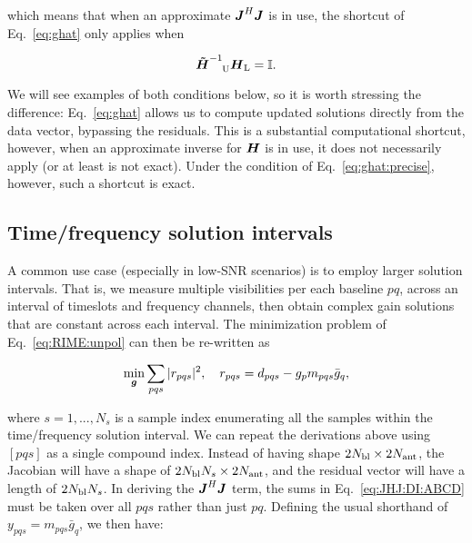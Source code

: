 \documentclass[useAMS,usenatbib]{mn2e}
\newcommand{\II}{\mathbb{I}}
\newcommand{\mat}[1]{{\bmath{#1}}}
\newcommand{\JJ}{\mat{J}} %
\newcommand{\HH}{\mat{H}} %
\newcommand{\HHa}{\mat{\tilde{H}}} %
\newcommand{\JHJ}{\JJ^H\JJ} %
\newcommand{\TOP}{\mathrm{U}}%
\newcommand{\LEFT}{\mathrm{L}}
\numberwithin{equation}{section} %
\providecommand{\DIFdelbegin}{} %
\providecommand{\DIFdelend}{} %
\begin{document}
\DIFdelend which means that when an approximate $\JHJ$ is in use, the shortcut of Eq.~\ref{eq:ghat} only applies when 
\DIFdelbegin %

\DIFdelend \begin{equation}
\label{eq:ghat:precise}
\HHa^{-1}_{~~~\TOP} \HH_\LEFT=\II.
\end{equation}

We will see examples of both conditions below, so it is worth stressing the difference: Eq.~\ref{eq:ghat}
allows us to compute updated solutions directly from the data vector, bypassing the residuals. This is a 
substantial computational shortcut, however, when an approximate inverse for $\HH$ is in use, it 
does not necessarily apply (or at least is not exact). Under the condition of Eq.~\ref{eq:ghat:precise}, however, 
such a shortcut is exact.


\subsection{Time/frequency solution intervals}
\label{sec:unpol:DI:avg}
\label{sec:solution-intervals}

\newcommand{\Ns}{N_s}

A common use case (especially in low-SNR scenarios) is to employ larger solution intervals. 
That is, we measure multiple visibilities per each baseline $pq$, across an interval of timeslots and
frequency channels, then obtain complex gain solutions that are constant across each interval. The 
minimization problem of Eq.~\ref{eq:RIME:unpol} can then be re-written as
\DIFdelbegin %

\DIFdelend \begin{equation}
\label{eq:cal:DI:tf}
\min_{\bmath{g}}\sum_{pqs}|r_{pqs}|^2, 
~~~r_{pqs} = d_{pqs}-g_p m_{pqs} \bar{g}_q, 
\end{equation}
\DIFdelbegin %

\DIFdelend where $s=1,...,N_s$ is a sample index enumerating all the samples within the 
time/frequency solution interval. We can repeat the derivations above using  $[pqs]$ as a
single compound index. Instead of having shape $2N_\mathrm{bl}\times2N_\mathrm{ant}$, the Jacobian 
will have a shape of $2\Nbl\Ns\times 2\Na$, and the residual vector will have a length of 
$2\Nbl\Ns$. In deriving the $\JHJ$ term, the sums in Eq.~\ref{eq:JHJ:DI:ABCD} must be taken over all $pqs$ 
rather than just $pq$. Defining the usual shorthand of 
$y_{pqs}=m_{pqs}\bar{g}_q$, we then have:
\DIFdelbegin %
\end{document}
